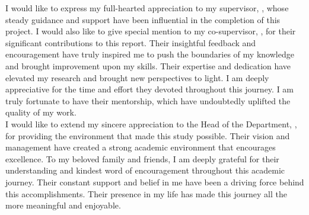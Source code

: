 
I would like to express my full-hearted appreciation to my supervisor, \sup,
whose steady guidance and support have been influential in the completion of
this project. I would also like to give special mention to my co-supervisor,
\cosup, for their significant contributions to this report. Their insightful
feedback and encouragement have truly inspired me to push the boundaries of my
knowledge and brought improvement upon my skills.  Their expertise and
dedication have elevated my research and brought new perspectives to light. I
am deeply appreciative for the time and effort they devoted throughout this
journey. I am truly fortunate to have their mentorship, which have undoubtedly
uplifted the quality of my work.\\


I would like to extend my sincere appreciation to the Head of the Department,
\hod, for providing the environment that made this study possible. Their vision
and management have created a strong academic environment that encourages
excellence. To my beloved family and friends, I am deeply grateful for their
understanding and kindest word of encouragement throughout this academic
journey. Their constant support and belief in me have been a driving force
behind this accomplishments. Their presence in my life has made this journey
all the more meaningful and enjoyable.


\pagebreak






